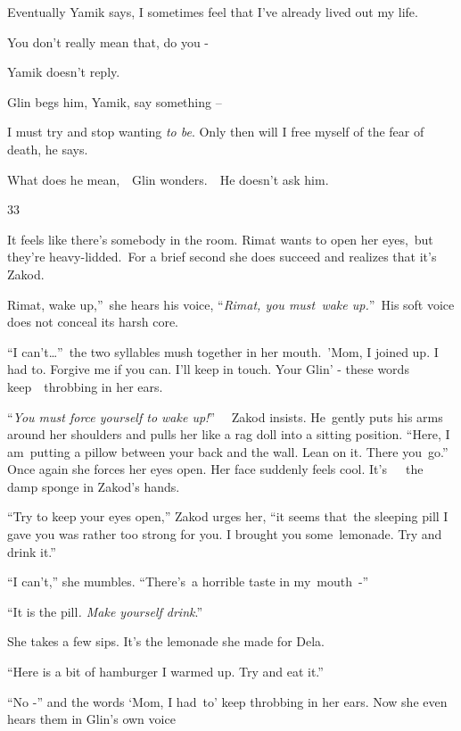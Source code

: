 \documentclass[twoside,11pt]{book}
\begin{document}
Eventually Yamik says, {\textquotedbl}I sometimes feel that I've already lived out my life.{\textquotedbl} 

{\textquotedbl}You don't really mean that, do you -{\textquotedbl}

Yamik doesn't reply.

Glin begs him, {\textquotedbl}Yamik, say something --{\textquotedbl} 

{\textquotedbl}I must try and stop wanting \textit{to be}. Only then will I free myself of the fear of
death,{\textquotedbl} he says. 

What does he mean,\ \ Glin wonders.\ \ He doesn't ask him.


\bigskip

33 

It feels like there{}'s somebody in the room. Rimat wants to open her eyes,\ but they're heavy-lidded.\ For a brief
second she does succeed and realizes that it{}'s Zakod.\ 

{\textquotedbl}Rimat, wake up,''\ she hears his voice, ``\textit{Rimat, you must\ wake up.}{}''\textit{\ }His soft voice
does not conceal its harsh core. 

{}``I can{}'t{\dots}''\  the two syllables mush together in her mouth.\ {}'Mom, I joined up. I had to. Forgive me if you
can. I{}'ll keep in touch. Your Glin{}' - these  words  keep\ \ throbbing  in her ears.

{}``\textit{You must force yourself to wake up!}{}'' \textit{\ }\ Zakod insists. He\ gently puts his arms around her
shoulders and pulls her like a rag doll into a sitting position. ``Here, I am\ putting a pillow between your back and
the wall. Lean on it. There you\ go.{}'' Once again she forces her eyes open. Her face suddenly feels cool.
It{}'s\ \ \ the damp sponge in Zakod{}'s hands. 

{}``Try to keep your eyes open,'' Zakod urges her, ``it seems that\ the sleeping pill I gave you was rather too strong
for you. I brought you some\ lemonade. Try and drink it.''

{}``I can{}'t,{}'' she mumbles. ``There{}'s\ a horrible taste in my\ mouth\ {}-''\ 

{}``It is the pill\textit{. Make yourself drink}.{}''\ 

She takes a few sips. It's the lemonade she made for Dela.

{}``Here is a bit of hamburger I warmed up. Try and eat it.{}''

{}``No -{}'' and the words `Mom, I had\ to' keep throbbing in her ears. Now she even hears them in Glin's own voice
\end{document}
